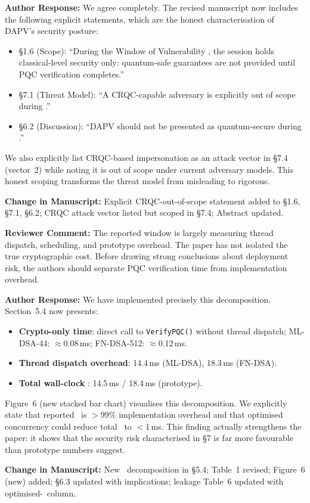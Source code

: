 \documentclass[12pt]{article}
\newcommand{\RC}[1]{\textcolor{reviewerblue}{\textbf{Reviewer Comment:}} #1}
\newcommand{\AR}[1]{\textcolor{replygreen}{\textbf{Author Response:}} #1}
\newcommand{\CH}[1]{\textcolor{changemagenta}{\textbf{Change in Manuscript:}} #1}
\begin{document}
\begin{replybox}
\AR{We agree completely.  The revised manuscript now includes the following
explicit statements, which are the honest characterisation of DAPV's
security posture:

\begin{itemize}
  \item \S1.6 (Scope): ``During the Window of Vulnerability \Dt, the
        session holds classical-level security only: quantum-safe guarantees
        are not provided until PQC verification completes.''
  \item \S7.1 (Threat Model): ``A CRQC-capable adversary is explicitly out
        of scope during \Dt.''
  \item \S6.2 (Discussion): ``DAPV should not be presented as quantum-secure
        during \Dt.''
\end{itemize}

We also explicitly list CRQC-based impersonation as an attack vector in
\S7.4 (vector~2) while noting it is out of scope under current adversary
models.  This honest scoping transforms the threat model from misleading to
rigorous.}

\CH{Explicit CRQC-out-of-scope statement added to \S1.6, \S7.1, \S6.2;
CRQC attack vector listed but scoped in \S7.4; Abstract updated.}
\end{replybox}

\begin{reviewbox}
\RC{The reported window is largely measuring thread dispatch, scheduling,
and prototype overhead.  The paper has not isolated the true cryptographic
cost.  Before drawing strong conclusions about deployment risk, the authors
should separate PQC verification time from implementation overhead.}
\end{reviewbox}

\begin{replybox}
\AR{We have implemented precisely this decomposition.  Section~5.4 now
presents:
\begin{itemize}
  \item \textbf{Crypto-only time}: direct call to \texttt{VerifyPQC()}
        without thread dispatch; ML-DSA-44: $\approx$0.08\,ms;
        FN-DSA-512: $\approx$0.12\,ms.
  \item \textbf{Thread dispatch overhead}: 14.4\,ms (ML-DSA), 18.3\,ms
        (FN-DSA).
  \item \textbf{Total wall-clock \Dt}: 14.5\,ms / 18.4\,ms (prototype).
\end{itemize}
Figure~6 (new stacked bar chart) visualises this decomposition.  We
explicitly state that reported \Dt\ is $>$99\% implementation overhead
and that optimised concurrency could reduce total \Dt\ to $<$1\,ms.
This finding actually strengthens the paper: it shows that the security
risk characterised in \S7 is far more favourable than prototype numbers suggest.}

\CH{New \Dt\ decomposition in \S5.4; Table~1 revised; Figure~6 (new) added;
\S6.3 updated with implications; leakage Table~6 updated with optimised-\Dt\
column.}
\end{replybox}
\end{document}
